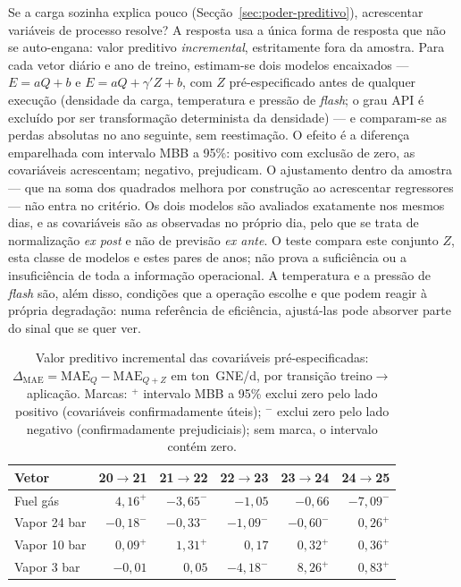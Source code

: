 Se a carga sozinha explica pouco (Secção~\ref{sec:poder-preditivo}), acrescentar
variáveis de processo resolve? A resposta usa a única forma de
resposta que não se auto-engana: valor preditivo \emph{incremental},
estritamente fora da amostra. Para cada vetor diário e ano de treino,
estimam-se dois modelos encaixados --- $E = aQ + b$ e $E = aQ + \gamma'Z + b$,
com $Z$ pré-especificado antes de qualquer execução (densidade da carga,
temperatura e pressão de \emph{flash}; o grau API é excluído por ser
transformação determinista da densidade) --- e comparam-se as perdas absolutas
no ano seguinte, sem reestimação. O efeito é a diferença emparelhada
 com intervalo MBB a 95\%: positivo com exclusão de zero, as covariáveis acrescentam;
negativo, prejudicam. O ajustamento dentro da amostra --- que na soma dos
quadrados melhora por construção ao acrescentar regressores --- não entra no
critério. Os dois modelos são avaliados exatamente nos mesmos dias, e as
covariáveis são as observadas no próprio dia, pelo que se trata de
normalização \emph{ex post} e não de previsão \emph{ex ante}. O teste
compara este conjunto $Z$, esta classe de modelos e estes pares de anos; não
prova a suficiência ou a insuficiência de toda a informação operacional. A
temperatura e a pressão de \emph{flash} são, além disso, condições que a
operação escolhe e que podem reagir à própria degradação: numa referência de
eficiência, ajustá-las pode absorver parte do sinal que se quer ver.

\begin{table}[htbp]
  \centering
  \caption[Valor incremental das covariáveis]{Valor preditivo
  incremental das covariáveis pré-especificadas:
  $\Delta_{\mathrm{MAE}} = \mathrm{MAE}_{Q} - \mathrm{MAE}_{Q+Z}$ em
  ton~GNE/d, por transição treino${\to}$aplicação. Marcas: $^{+}$ intervalo
  MBB a 95\% exclui zero pelo lado positivo (covariáveis confirmadamente
  úteis); $^{-}$ exclui zero pelo lado negativo (confirmadamente
  prejudiciais); sem marca, o intervalo contém zero.}
  \label{tab:covariaveis-incremental}
  \begin{tabular}{lrrrrr}
    \toprule
    Vetor & \multicolumn{1}{c}{20${\to}$21} & \multicolumn{1}{c}{21${\to}$22}
    & \multicolumn{1}{c}{22${\to}$23} & \multicolumn{1}{c}{23${\to}$24}
    & \multicolumn{1}{c}{24${\to}$25} \\
    \midrule
    Fuel gás     & $4{,}16^{+}$  & $-3{,}65^{-}$ & $-1{,}05$      & $-0{,}66$     & $-7{,}09^{-}$ \\
    Vapor 24 bar & $-0{,}18^{-}$ & $-0{,}33^{-}$ & $-1{,}09^{-}$  & $-0{,}60^{-}$ & $0{,}26^{+}$  \\
    Vapor 10 bar & $0{,}09^{+}$  & $1{,}31^{+}$  & $0{,}17$       & $0{,}32^{+}$  & $0{,}36^{+}$  \\
    Vapor 3 bar  & $-0{,}01$     & $0{,}05$      & $-4{,}18^{-}$  & $8{,}26^{+}$  & $0{,}83^{+}$  \\
    \bottomrule
  \end{tabular}
\end{table}

